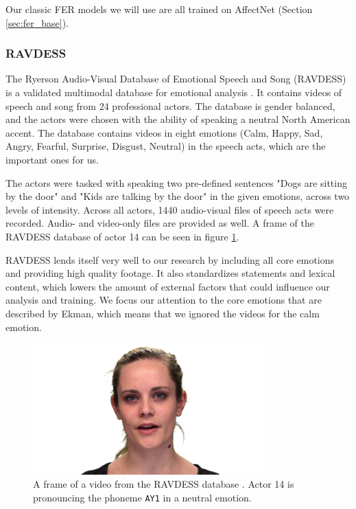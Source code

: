 Our classic FER models we will use are all trained on AffectNet (Section \ref{sec:fer_base}).

\subsubsection{RAVDESS}
\label{sub:ravdess}
The Ryerson Audio-Visual Database of Emotional Speech and Song (RAVDESS) is a validated multimodal database for emotional analysis \cite{livingstone2018ryerson}. It contains videos of speech and song from 24 professional actors. The database is gender balanced, and the actors were chosen with the ability of speaking a neutral North American accent. The database contains videos in eight emotions (Calm, Happy, Sad, Angry, Fearful, Surprise, Disgust, Neutral) in the speech acts, which are the important ones for us.

The actors were tasked with speaking two pre-defined sentences "Dogs are sitting by the door" and "Kids are talking by the door" in the given emotions, across two levels of intensity. Across all actors, 1440 audio-visual files of speech acts were recorded. Audio- and video-only files are provided as well. A frame of the RAVDESS database of actor 14 can be seen in figure \ref{fig:ravdess_example}.

RAVDESS lends itself very well to our research by including all core emotions and providing high quality footage. It also standardizes statements and lexical content, which lowers the amount of external factors that could influence our analysis and training. We focus our attention to the core emotions that are described by Ekman, which means that we ignored the videos for the calm emotion.

\begin{figure}
    \centering
    \includegraphics[width=0.8\textwidth]{res/img_ravdess_example_neutral_14AY1.png}
    \caption{A frame of a video from the RAVDESS database \cite{livingstone2018ryerson}. Actor 14 is pronouncing the phoneme \texttt{AY1} in a neutral emotion.}
    \label{fig:ravdess_example}
\end{figure}

